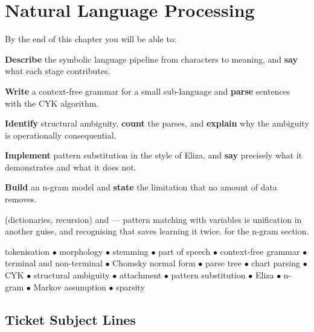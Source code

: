 \chapter{Natural Language Processing}\label{ch:nlp}

\begin{outcomes}
By the end of this chapter you will be able to:
\begin{tight}
  \item \textbf{Describe} the symbolic language pipeline from characters to
        meaning, and \textbf{say} what each stage contributes.
  \item \textbf{Write} a context-free grammar for a small sub-language and
        \textbf{parse} sentences with the CYK algorithm.
  \item \textbf{Identify} structural ambiguity, \textbf{count} the parses, and
        \textbf{explain} why the ambiguity is operationally consequential.
  \item \textbf{Implement} pattern substitution in the style of Eliza, and
        \textbf{say} precisely what it demonstrates and what it does not.
  \item \textbf{Build} an n-gram model and \textbf{state} the limitation that no
        amount of data removes.
\end{tight}
\end{outcomes}

\begin{prereq}
 (dictionaries, recursion) and  --- pattern matching with
variables is unification in another guise, and recognising that saves learning it
twice.  for the n-gram section.
\end{prereq}

\begin{keyterms}
tokenisation $\bullet$ morphology $\bullet$ stemming $\bullet$ part of speech
$\bullet$ context-free grammar $\bullet$ terminal and non-terminal $\bullet$
Chomsky normal form $\bullet$ parse tree $\bullet$ chart parsing $\bullet$ CYK
$\bullet$ structural ambiguity $\bullet$ attachment $\bullet$ pattern substitution
$\bullet$ Eliza $\bullet$ n-gram $\bullet$ Markov assumption $\bullet$ sparsity
\end{keyterms}

\section{Ticket Subject Lines}

